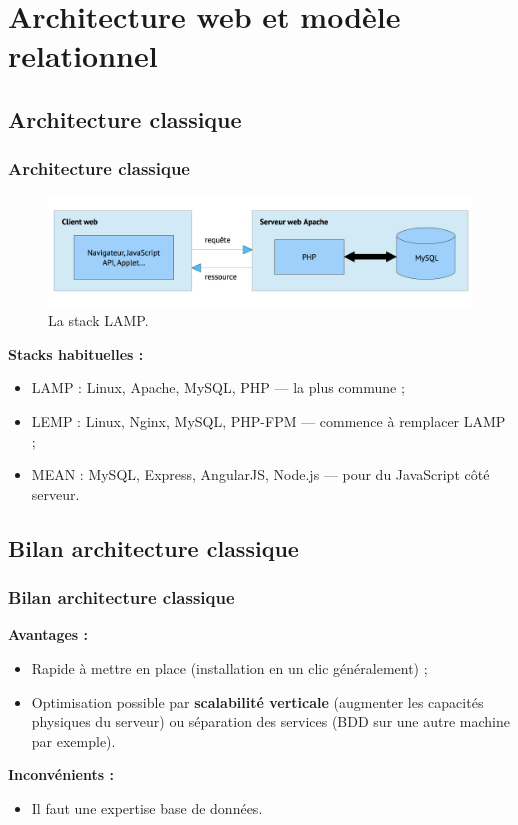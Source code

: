 \section{Architecture web et modèle relationnel}

	\subsection{Architecture classique}
	\begin{frame}
		\frametitle{Architecture classique}

		\begin{figure}[htb]
			\includegraphics[width=1\textwidth]{images/LAMP.png}
			\caption{La stack LAMP.}
		\end{figure}

		\textbf{Stacks habituelles :}
		\begin{itemize}
			\item LAMP : Linux, Apache, MySQL, PHP — la plus commune ;
			\item LEMP : Linux, Nginx, MySQL, PHP-FPM — commence à remplacer LAMP ;
			\item MEAN : MySQL, Express, AngularJS, Node.js — pour du JavaScript côté serveur.
		\end{itemize}
	\end{frame}

	\subsection{Bilan architecture classique}
	\begin{frame}
		\frametitle{Bilan architecture classique}

		\textbf{Avantages :}
		\begin{itemize}
			\item Rapide à mettre en place (installation en un clic généralement) ;
			\item Optimisation possible par \textbf{scalabilité verticale} (augmenter les capacités physiques du serveur) ou séparation des services (BDD sur une autre machine par exemple).
		\end{itemize}

		\vspace{20px}

		\textbf{Inconvénients :}
		\begin{itemize}
			\item Il faut une expertise base de données.
		\end{itemize}
	\end{frame}

